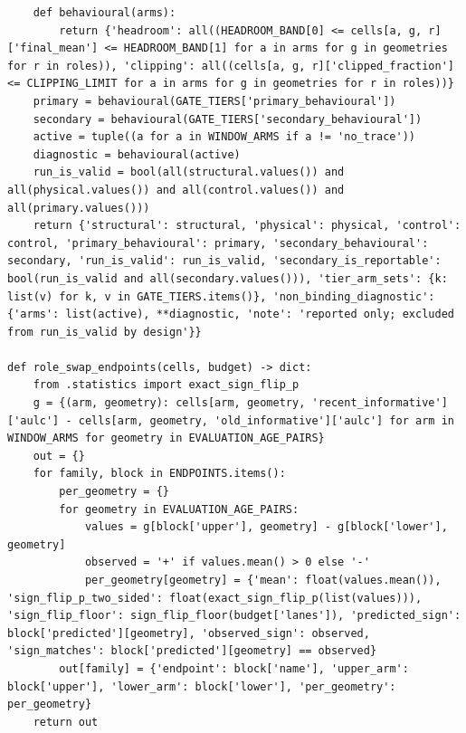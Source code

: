 \documentclass[a4paper,10pt]{article}
\begin{document}
\begin{Verbatim}
    def behavioural(arms):
        return {'headroom': all((HEADROOM_BAND[0] <= cells[a, g, r]['final_mean'] <= HEADROOM_BAND[1] for a in arms for g in geometries for r in roles)), 'clipping': all((cells[a, g, r]['clipped_fraction'] <= CLIPPING_LIMIT for a in arms for g in geometries for r in roles))}
    primary = behavioural(GATE_TIERS['primary_behavioural'])
    secondary = behavioural(GATE_TIERS['secondary_behavioural'])
    active = tuple((a for a in WINDOW_ARMS if a != 'no_trace'))
    diagnostic = behavioural(active)
    run_is_valid = bool(all(structural.values()) and all(physical.values()) and all(control.values()) and all(primary.values()))
    return {'structural': structural, 'physical': physical, 'control': control, 'primary_behavioural': primary, 'secondary_behavioural': secondary, 'run_is_valid': run_is_valid, 'secondary_is_reportable': bool(run_is_valid and all(secondary.values())), 'tier_arm_sets': {k: list(v) for k, v in GATE_TIERS.items()}, 'non_binding_diagnostic': {'arms': list(active), **diagnostic, 'note': 'reported only; excluded from run_is_valid by design'}}

def role_swap_endpoints(cells, budget) -> dict:
    from .statistics import exact_sign_flip_p
    g = {(arm, geometry): cells[arm, geometry, 'recent_informative']['aulc'] - cells[arm, geometry, 'old_informative']['aulc'] for arm in WINDOW_ARMS for geometry in EVALUATION_AGE_PAIRS}
    out = {}
    for family, block in ENDPOINTS.items():
        per_geometry = {}
        for geometry in EVALUATION_AGE_PAIRS:
            values = g[block['upper'], geometry] - g[block['lower'], geometry]
            observed = '+' if values.mean() > 0 else '-'
            per_geometry[geometry] = {'mean': float(values.mean()), 'sign_flip_p_two_sided': float(exact_sign_flip_p(list(values))), 'sign_flip_floor': sign_flip_floor(budget['lanes']), 'predicted_sign': block['predicted'][geometry], 'observed_sign': observed, 'sign_matches': block['predicted'][geometry] == observed}
        out[family] = {'endpoint': block['name'], 'upper_arm': block['upper'], 'lower_arm': block['lower'], 'per_geometry': per_geometry}
    return out
\end{Verbatim}
\end{document}

